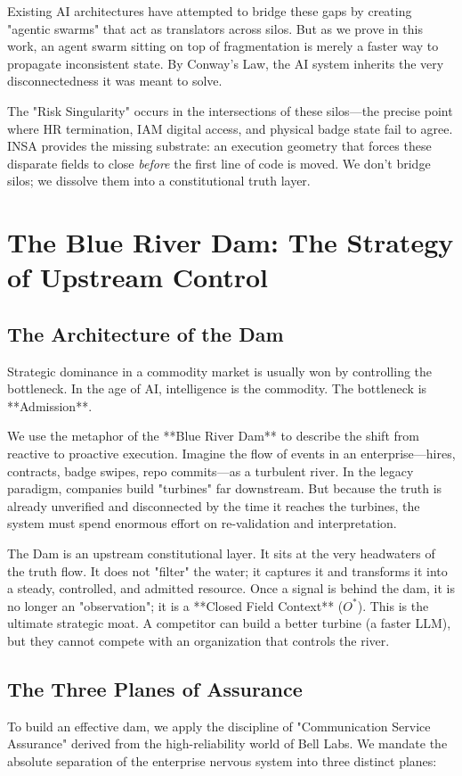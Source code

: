 \documentclass[12pt,a4paper,oneside]{book}
\begin{document}
Existing AI architectures have attempted to bridge these gaps by creating "agentic swarms" that act as translators across silos. But as we prove in this work, an agent swarm sitting on top of fragmentation is merely a faster way to propagate inconsistent state. By Conway’s Law, the AI system inherits the very disconnectedness it was meant to solve. 

The "Risk Singularity" occurs in the intersections of these silos—the precise point where HR termination, IAM digital access, and physical badge state fail to agree. INSA provides the missing substrate: an execution geometry that forces these disparate fields to close \textit{before} the first line of code is moved. We don't bridge silos; we dissolve them into a constitutional truth layer.

\chapter{The Blue River Dam: The Strategy of Upstream Control}

\section{The Architecture of the Dam}
Strategic dominance in a commodity market is usually won by controlling the bottleneck. In the age of AI, intelligence is the commodity. The bottleneck is **Admission**.

We use the metaphor of the **Blue River Dam** to describe the shift from reactive to proactive execution. Imagine the flow of events in an enterprise—hires, contracts, badge swipes, repo commits—as a turbulent river. In the legacy paradigm, companies build "turbines" far downstream. But because the truth is already unverified and disconnected by the time it reaches the turbines, the system must spend enormous effort on re-validation and interpretation.

The Dam is an upstream constitutional layer. It sits at the very headwaters of the truth flow. It does not "filter" the water; it captures it and transforms it into a steady, controlled, and admitted resource. Once a signal is behind the dam, it is no longer an "observation"; it is a **Closed Field Context** ($O^*$). This is the ultimate strategic moat. A competitor can build a better turbine (a faster LLM), but they cannot compete with an organization that controls the river.

\section{The Three Planes of Assurance}
To build an effective dam, we apply the discipline of "Communication Service Assurance" derived from the high-reliability world of Bell Labs. We mandate the absolute separation of the enterprise nervous system into three distinct planes:
\end{document}
